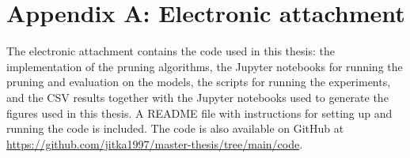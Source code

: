 \chapter*{Appendix A: Electronic attachment} %

The electronic attachment contains the code used in this thesis: the implementation of the pruning algorithms, the Jupyter notebooks for running the pruning and evaluation on the models, the scripts for running the experiments, and the CSV results together with the Jupyter notebooks used to generate the figures used in this thesis. A README file with instructions for setting up and running the code is included. The code is also available on GitHub at \url{https://github.com/jitka1997/master-thesis/tree/main/code}.
